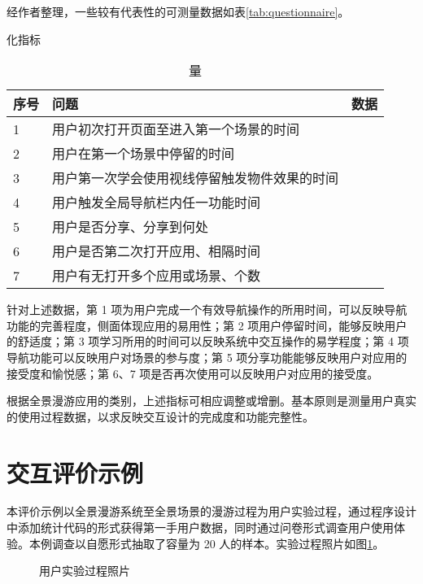 经作者整理，一些较有代表性的可测量数据如表\ref{tab:questionnaire}。

\begin{table}[htp]
\centering
\caption 量化指标
\vskip 5pt
\begin{tabular}{lll}
\toprule
序号 & 问题 & 数据 \\
\midrule
1 & 用户初次打开页面至进入第一个场景的时间 & 	\\
2 &  用户在第一个场景中停留的时间 & \\
3 & 用户第一次学会使用视线停留触发物件效果的时间 & \\
4 & 用户触发全局导航栏内任一功能时间 & \\
5 & 用户是否分享、分享到何处 & \\
6 & 用户是否第二次打开应用、相隔时间 & \\
7 & 用户有无打开多个应用或场景、个数 & \\
\bottomrule
\end{tabular}
\label{tab:questionnaire2}
\end{table}

针对上述数据，第 1 项为用户完成一个有效导航操作的所用时间，可以反映导航功能的完善程度，侧面体现应用的易用性；第 2 项用户停留时间，能够反映用户的舒适度；第 3 项学习所用的时间可以反映系统中交互操作的易学程度；第 4 项导航功能可以反映用户对场景的参与度；第 5 项分享功能能够反映用户对应用的接受度和愉悦感；第 6、7 项是否再次使用可以反映用户对应用的接受度。

根据全景漫游应用的类别，上述指标可相应调整或增删。基本原则是测量用户真实的使用过程数据，以求反映交互设计的完成度和功能完整性。


\section{交互评价示例}

本评价示例以全景漫游系统至全景场景的漫游过程为用户实验过程，通过程序设计中添加统计代码的形式获得第一手用户数据，同时通过问卷形式调查用户使用体验。本例调查以自愿形式抽取了容量为 20 人的样本。实验过程照片如图\ref{fig:photo}。


\begin{figure}[htp]
\centering
\fbox{
  \texttt{[image: p1]}
}
\fbox{
  \texttt{[image: p2]}
}
\caption{用户实验过程照片}
\label{fig:photo}
\end{figure}


